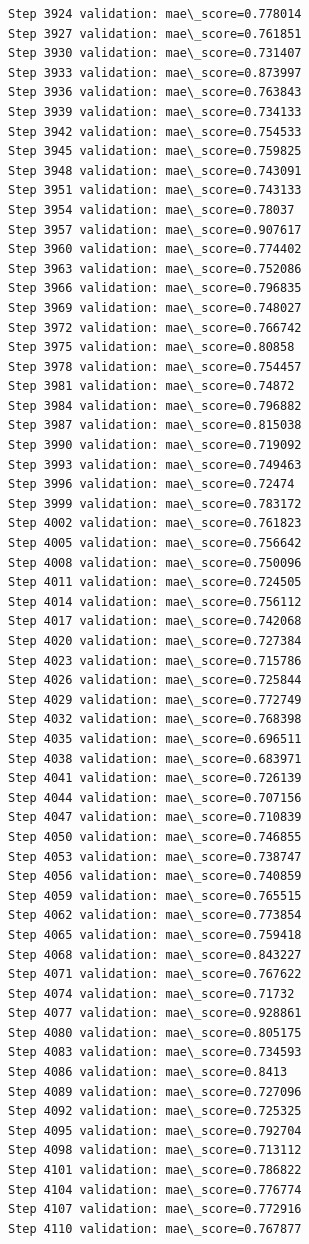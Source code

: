 \documentclass[11pt]{article}
\begin{document}
\begin{Verbatim}[commandchars=\\\{\}]
Step 3924 validation: mae\_score=0.778014
Step 3927 validation: mae\_score=0.761851
Step 3930 validation: mae\_score=0.731407
Step 3933 validation: mae\_score=0.873997
Step 3936 validation: mae\_score=0.763843
Step 3939 validation: mae\_score=0.734133
Step 3942 validation: mae\_score=0.754533
Step 3945 validation: mae\_score=0.759825
Step 3948 validation: mae\_score=0.743091
Step 3951 validation: mae\_score=0.743133
Step 3954 validation: mae\_score=0.78037
Step 3957 validation: mae\_score=0.907617
Step 3960 validation: mae\_score=0.774402
Step 3963 validation: mae\_score=0.752086
Step 3966 validation: mae\_score=0.796835
Step 3969 validation: mae\_score=0.748027
Step 3972 validation: mae\_score=0.766742
Step 3975 validation: mae\_score=0.80858
Step 3978 validation: mae\_score=0.754457
Step 3981 validation: mae\_score=0.74872
Step 3984 validation: mae\_score=0.796882
Step 3987 validation: mae\_score=0.815038
Step 3990 validation: mae\_score=0.719092
Step 3993 validation: mae\_score=0.749463
Step 3996 validation: mae\_score=0.72474
Step 3999 validation: mae\_score=0.783172
Step 4002 validation: mae\_score=0.761823
Step 4005 validation: mae\_score=0.756642
Step 4008 validation: mae\_score=0.750096
Step 4011 validation: mae\_score=0.724505
Step 4014 validation: mae\_score=0.756112
Step 4017 validation: mae\_score=0.742068
Step 4020 validation: mae\_score=0.727384
Step 4023 validation: mae\_score=0.715786
Step 4026 validation: mae\_score=0.725844
Step 4029 validation: mae\_score=0.772749
Step 4032 validation: mae\_score=0.768398
Step 4035 validation: mae\_score=0.696511
Step 4038 validation: mae\_score=0.683971
Step 4041 validation: mae\_score=0.726139
Step 4044 validation: mae\_score=0.707156
Step 4047 validation: mae\_score=0.710839
Step 4050 validation: mae\_score=0.746855
Step 4053 validation: mae\_score=0.738747
Step 4056 validation: mae\_score=0.740859
Step 4059 validation: mae\_score=0.765515
Step 4062 validation: mae\_score=0.773854
Step 4065 validation: mae\_score=0.759418
Step 4068 validation: mae\_score=0.843227
Step 4071 validation: mae\_score=0.767622
Step 4074 validation: mae\_score=0.71732
Step 4077 validation: mae\_score=0.928861
Step 4080 validation: mae\_score=0.805175
Step 4083 validation: mae\_score=0.734593
Step 4086 validation: mae\_score=0.8413
Step 4089 validation: mae\_score=0.727096
Step 4092 validation: mae\_score=0.725325
Step 4095 validation: mae\_score=0.792704
Step 4098 validation: mae\_score=0.713112
Step 4101 validation: mae\_score=0.786822
Step 4104 validation: mae\_score=0.776774
Step 4107 validation: mae\_score=0.772916
Step 4110 validation: mae\_score=0.767877

\end{Verbatim}
\end{document}
